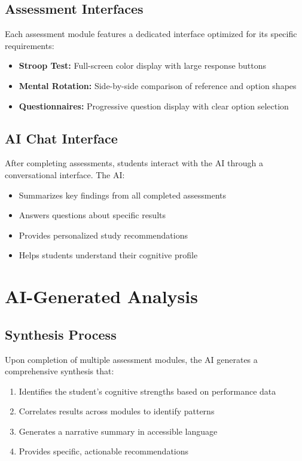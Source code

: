 \documentclass[11pt,a4paper]{article}
\begin{document}
\subsection{Assessment Interfaces}

Each assessment module features a dedicated interface optimized for its specific requirements:
\begin{itemize}[noitemsep]
    \item \textbf{Stroop Test:} Full-screen color display with large response buttons
    \item \textbf{Mental Rotation:} Side-by-side comparison of reference and option shapes
    \item \textbf{Questionnaires:} Progressive question display with clear option selection
\end{itemize}

\subsection{AI Chat Interface}

After completing assessments, students interact with the AI through a conversational interface. The AI:
\begin{itemize}[noitemsep]
    \item Summarizes key findings from all completed assessments
    \item Answers questions about specific results
    \item Provides personalized study recommendations
    \item Helps students understand their cognitive profile
\end{itemize}

\section{AI-Generated Analysis}

\subsection{Synthesis Process}

Upon completion of multiple assessment modules, the AI generates a comprehensive synthesis that:

\begin{enumerate}[noitemsep]
    \item Identifies the student's cognitive strengths based on performance data
    \item Correlates results across modules to identify patterns
    \item Generates a narrative summary in accessible language
    \item Provides specific, actionable recommendations
\end{enumerate}
\end{document}
